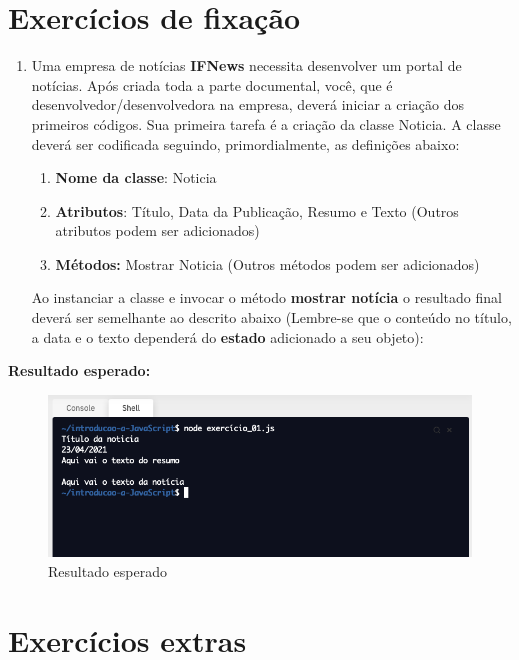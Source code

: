 \section{Exercícios de fixação}

\begin{enumerate}
	\item Uma empresa de notícias \textbf{IFNews} necessita desenvolver um portal de notícias. Após criada toda a parte documental, você, que é desenvolvedor/desenvolvedora na empresa, deverá iniciar a criação dos primeiros códigos. Sua primeira tarefa é a criação da classe Noticia. A classe deverá ser codificada seguindo, primordialmente, as definições abaixo: 
	
	\begin{enumerate}
		\item \textbf{Nome da classe}: Noticia
		\item \textbf{Atributos}: Título, Data da Publicação, Resumo e Texto (Outros atributos podem ser adicionados)
		\item \textbf{Métodos:} Mostrar Noticia (Outros métodos podem ser adicionados)
	\end{enumerate}

	Ao instanciar a classe e invocar o método \textbf{mostrar notícia} o resultado final deverá ser semelhante ao descrito abaixo (Lembre-se que o conteúdo no título, a data e o texto dependerá do \textbf{estado} adicionado a seu objeto): 
\end{enumerate}

\textbf{Resultado esperado:} 

\begin{figure}[H]
	\centering
	\includegraphics[scale=0.5]{imagens/saida-exer-01.png}
	\caption{Resultado esperado}
	\label{fig:resultado}
\end{figure}

\section{Exercícios extras}

